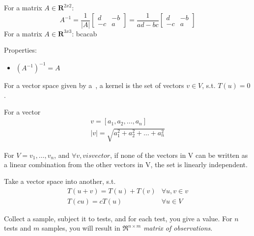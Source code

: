 \begin{definition}[Inverse]
    For a matrix $A \in \mathbf{R}^{2x2}$:
    $$
    A^{-1} = \frac{1}{|A|}
    \begin{bmatrix}
    d & -b \\
    -c & a
    \end{bmatrix}
    = \frac{1}{ad - bc}
    \begin{bmatrix}
    d & -b \\
    -c & a
    \end{bmatrix}
    $$
    For a matrix $A \in \mathbf{R}^{3x3}$: bcacab

    Properties:
    \begin{itemize}
    \item $(A^{-1})^{-1} = A$
    \end{itemize}
\end{definition}

\begin{definition}[Kernel]
    For a vector space given by a~, a kernel is the set
    of vectors $v \in V$, s.t. $T(u) = 0$.
\end{definition}

\begin{definition}\label{vectorlength}
    For a vector 
    \begin{align*}
        v = [a_{1}, a_{2}, \dots , a_{n}] \\
        |v| = \sqrt{a^{2}_{1} + a^{2}_{2} + \dots + a^{2}_{n}}{}
    \end{align*}
\end{definition}

\begin{definition}
    For $V = {v_{1}, \dots, v_{n}}$, and $\forall v, v is vector$,
    if none of the vectors in V can be written as a linear combination
    from the other vectors in V, the set is linearly independent.
\end{definition}

\begin{definition}\label{lintrans}
    Take a vector space into another, s.t.\
    \begin{align}
        T(u + v) = T(u) + T(v) &\forall u,v \in v \\
        T(cu) = cT(u) &\forall u \in V
    \end{align}
\end{definition}

\begin{definition}
    Collect a sample, subject it to tests, and for each test, you give a value.
    For $n$ tests and $m$ samples, you will result in $\Re^{n\times{m}}$ 
    \textit{matrix of observations}.
\end{definition}

